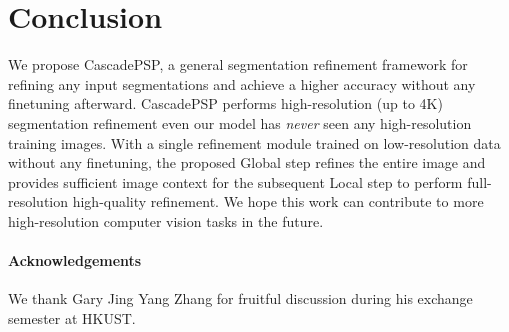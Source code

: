 \documentclass[10pt,twocolumn,letterpaper]{article}
\begin{document}
\section{Conclusion}
\vspace{-0.05in}
We propose CascadePSP, a general segmentation refinement framework for refining any input segmentations and achieve a higher accuracy without any finetuning afterward. CascadePSP performs high-resolution (up to 4K) segmentation refinement even our model has \textit{never} seen any high-resolution training images. 
With a single refinement module trained on low-resolution data without any finetuning, the proposed Global step refines the entire image and provides sufficient image context for the subsequent Local step to perform full-resolution high-quality refinement.
We hope this work can contribute to more high-resolution computer vision tasks in the future.
\vspace{-1em}

{\small
\paragraph{Acknowledgements}
We thank Gary Jing Yang Zhang for fruitful discussion during his exchange semester at HKUST.
}
\end{document}
